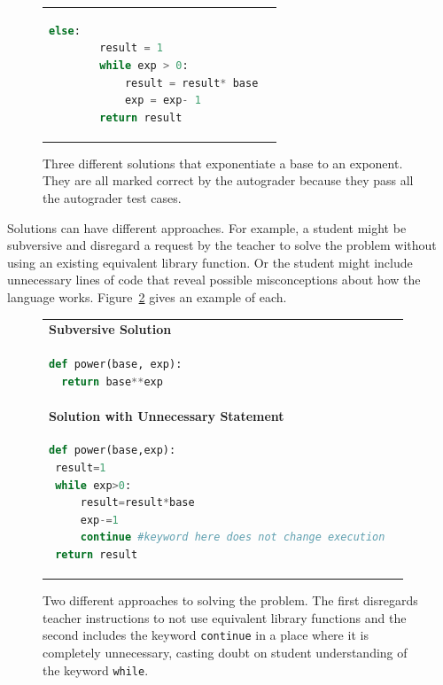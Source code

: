 \begin{figure}
\begin{tabular}{ll}
\begin{minipage}{0.5\linewidth}
\begin{lstlisting}[basicstyle=\linespread{1.0}\ttfamily\footnotesize,language=python]
    else:
        result = 1
        while exp > 0:
            result = result* base
            exp = exp- 1
        return result
\end{lstlisting}
\end{minipage} 
\end{tabular}
\caption{Three different solutions that exponentiate a base to an exponent. They are all marked correct by the autograder because they pass all the autograder test cases.}
\label{table:diffapproaches}
\end{figure}

Solutions can have different approaches. For example, a student might be subversive and disregard a request by the teacher to solve the problem without using an existing equivalent library function. Or the student might include unnecessary lines of code that reveal possible misconceptions about how the language works. Figure~\ref{table:morediffapproaches} gives an example of each.

\begin{figure}
\begin{tabular}{ll}
{\bf Subversive Solution} &  \\
\begin{minipage}{0.5\linewidth}
\begin{lstlisting}[basicstyle=\linespread{1.0}\ttfamily\footnotesize,language=python]
def power(base, exp):
  return base**exp
\end{lstlisting}
\end{minipage}
& \\

{\bf Solution with Unnecessary Statement} & \\
\begin{minipage}{1.0\linewidth}
\begin{lstlisting}[basicstyle=\linespread{1.0}\ttfamily\footnotesize,language=python]
def power(base,exp):
 result=1
 while exp>0:
     result=result*base
     exp-=1
     continue #keyword here does not change execution
 return result
\end{lstlisting}
\end{minipage} 
\end{tabular}
\caption{Two different approaches to solving the problem. The first disregards teacher instructions to not use equivalent library functions and the second includes the keyword \texttt{continue} in a place where it is completely unnecessary, casting doubt on student understanding of the keyword \texttt{while}.}
\label{table:morediffapproaches}
\end{figure}

